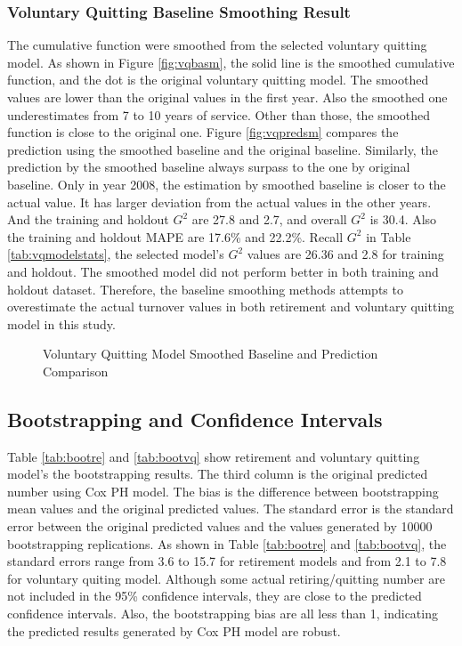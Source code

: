 \subsubsection{Voluntary Quitting Baseline Smoothing Result}
The cumulative function were smoothed from the selected voluntary quitting model. As shown in Figure \ref{fig:vqbasm}, the solid line is the smoothed cumulative function, and the dot is the original voluntary quitting model. The smoothed values are lower than the original values in the first year. Also the smoothed one underestimates from 7 to 10 years of service. Other than those, the smoothed function is close to the original one.  Figure \ref{fig:vqpredsm} compares the prediction using the smoothed baseline and the original baseline. Similarly, the prediction by the smoothed baseline always surpass to the one by original baseline. Only in year 2008, the estimation by smoothed baseline is closer to the actual value. It has larger deviation from the actual values in the other years. And the training and holdout $G^2$ are 27.8 and 2.7, and overall $G^2$ is 30.4. Also the training and holdout MAPE are 17.6\% and 22.2\%. Recall $G^2$ in Table \ref{tab:vqmodelstats}, the selected model's $G^2$ values are 26.36 and 2.8 for training and holdout. The smoothed model did not perform better in both training and holdout dataset. Therefore, the baseline smoothing methods attempts to overestimate the actual turnover values in both retirement and voluntary quitting model in this study.
\begin{figure}[h!]
	\centering
	\caption{Voluntary Quitting Model Smoothed Baseline and Prediction Comparison}
	\label{fig:vqbaselinesm}
\end{figure}

\subsection{Bootstrapping and Confidence Intervals}
Table \ref{tab:bootre} and \ref{tab:bootvq} show retirement and voluntary quitting model's the bootstrapping results. The third column is the original predicted number using Cox PH model. The bias is the difference between bootstrapping mean values and the original predicted values. The standard error is the standard error between the original predicted values and the values generated by 10000 bootstrapping replications. As shown in Table \ref{tab:bootre} and \ref{tab:bootvq}, the standard errors range from 3.6 to 15.7 for retirement models and from 2.1 to 7.8 for voluntary quiting model. Although some actual retiring/quitting number are not included in the 95\% confidence intervals, they are close to the predicted confidence intervals. Also, the bootstrapping bias are all less than 1, indicating the predicted results generated by Cox PH model are robust. 

